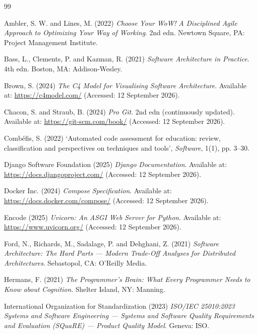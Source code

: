 \documentclass[a4paper,11pt]{article}
\begin{document}
\begin{thebibliography}{99}
\setlength{\itemsep}{5pt}

Ambler, S. W. and Lines, M. (2022) \textit{Choose Your WoW! A Disciplined Agile
Approach to Optimizing Your Way of Working}. 2nd edn. Newtown Square, PA:
Project Management Institute.

Bass, L., Clements, P. and Kazman, R. (2021) \textit{Software Architecture in
Practice}. 4th edn. Boston, MA: Addison-Wesley.

Brown, S. (2024) \textit{The C4 Model for Visualising Software Architecture}.
Available at: \url{https://c4model.com/} (Accessed: 12 September 2026).

Chacon, S. and Straub, B. (2024) \textit{Pro Git}. 2nd edn (continuously
updated). Available at: \url{https://git-scm.com/book/} (Accessed:
12 September 2026).

Comb\'{e}fis, S. (2022) `Automated code assessment for education: review,
classification and perspectives on techniques and tools', \textit{Software},
1(1), pp. 3--30.

Django Software Foundation (2025) \textit{Django Documentation}. Available at:
\url{https://docs.djangoproject.com/} (Accessed: 12 September 2026).

Docker Inc. (2024) \textit{Compose Specification}. Available at:
\url{https://docs.docker.com/compose/} (Accessed: 12 September 2026).

Encode (2025) \textit{Uvicorn: An ASGI Web Server for Python}. Available at:
\url{https://www.uvicorn.org/} (Accessed: 12 September 2026).

Ford, N., Richards, M., Sadalage, P. and Dehghani, Z. (2021) \textit{Software
Architecture: The Hard Parts --- Modern Trade-Off Analyses for Distributed
Architectures}. Sebastopol, CA: O'Reilly Media.

Hermans, F. (2021) \textit{The Programmer's Brain: What Every Programmer Needs
to Know about Cognition}. Shelter Island, NY: Manning.

International Organization for Standardization (2023) \textit{ISO/IEC
25010:2023 Systems and Software Engineering --- Systems and Software Quality
Requirements and Evaluation (SQuaRE) --- Product Quality Model}. Geneva: ISO.


\end{thebibliography}
\end{document}
